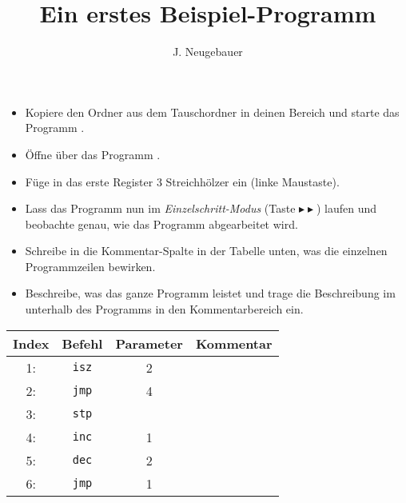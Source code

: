 \documentclass[10pt, a4paper]{scrartcl}
\author{J. Neugebauer}
\title{Ein erstes Beispiel-Programm}
\date{\Heute}
\begin{document}
\ReiheTitel

\begin{aufgabe}[symbol=\symLaptop]
	\label{afg:afg1}
	\begin{itemize}
		\item Kopiere den Ordner  aus dem Tauschordner in deinen Bereich und starte das Programm .
		\item Öffne über  das Programm .
		\item Füge in das erste Register 3 Streichhölzer ein (linke Maustaste).
		\item Lass das Programm nun im \emph{Einzelschritt-Modus} (Taste $\blacktriangleright\blacktriangleright$) laufen und beobachte genau, wie das Programm abgearbeitet wird.
	\end{itemize}

	\bigskip
	\begin{itemize}
		\item Schreibe in die Kommentar-Spalte in der Tabelle unten, was die einzelnen Programmzeilen bewirken.
		\item Beschreibe, was das ganze Programm leistet und trage die Beschreibung im  unterhalb des Programms in den Kommentarbereich ein.
	\end{itemize}

	\begin{center}
	\begin{tabularx}{.8\textwidth}{|c|c|c|X|}\hline
		\rowcolor{ngb.tabelle.kopf.hg}
		Index & Befehl & Parameter & Kommentar \\\hline
		1: & \texttt{isz} & 2 & \Zeilenabstand\\\hline
		2: & \texttt{jmp} & 4 & \Zeilenabstand\\\hline
		3: & \texttt{stp} &   & \Zeilenabstand\\\hline
		4: & \texttt{inc} & 1 & \Zeilenabstand\\\hline
		5: & \texttt{dec} & 2 & \Zeilenabstand\\\hline
		6: & \texttt{jmp} & 1 & \Zeilenabstand\\\hline
	\end{tabularx}
	\end{center}
\end{aufgabe}
\end{document}
